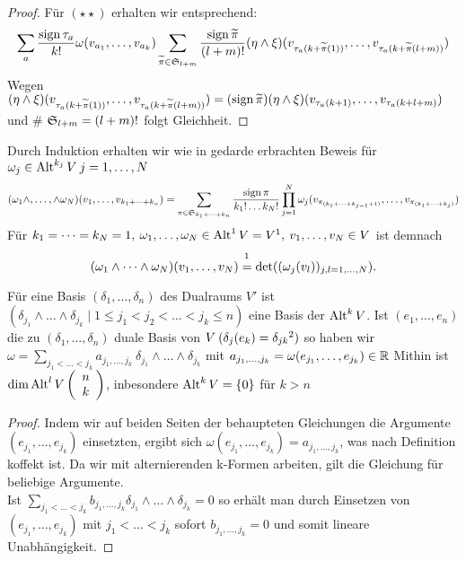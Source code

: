 \documentclass[skript.tex]{subfiles}
\begin{document}
\begin{proof}
		Für $(\star \star)$ erhalten wir entsprechend:
		\begin{equation*}
		\sum_a \frac{\operatorname{sign} \tau_a}{k!} \omega(v_{a_1}, \dots, v_{a_k})\sum_{\widetilde{\pi} \in \mathfrak{S}_{l+m}} \frac{\operatorname{sign} \widetilde{\pi}}{(l+m)!} (\eta \wedge \xi)(v_{\tau_a(k+\widetilde{\pi}(1))}, \dots, v_{\tau_a(k+\widetilde{\pi}(l+m))})
		\end{equation*}
		Wegen $(\eta \wedge \xi)(v_{\tau_a(k+\widetilde{\pi}(1))}, \dots, v_{\tau_a(k+\widetilde{\pi}(l+m))}) = (\operatorname{sign} \widetilde{\pi})(\eta \wedge \xi)(v_{\tau_a(k+1)}, \dots, v_{\tau_a(k+l+m)})$ und  \# $\mathfrak{S}_{l+m} = (l+m)!$ folgt Gleichheit.
	\end{proof}
		\begin{bem}
			Durch Induktion erhalten wir wie in gedarde erbrachten Beweis für $\omega_j \in \operatorname{Alt}^{k_j} V \: j=1, \dots, N$
			\begin{equation*}
			(\omega_1 \wedge, \dots, \wedge \omega_N)(v_1, \dots, v_{k_1+ \dots + k_n}) = \sum_{\pi \in \mathfrak{S}_{k_1 + \dots + k_n}} \frac{\operatorname{sign} \pi}{k_1! \dots k_N!} \prod_{j=1}^{N} \omega_j(v_{\pi_{(k_1+ \dots + k_{j-1}+1)}}, \dots, v_{\pi_{(k_1+ \dots + k_j)}})
			\end{equation*}
			Für $k_1 = \dots = k_N = 1, \: \omega_1, \dots, \omega_N \in \operatorname{Alt}^1 V = V^1, \: v_1, \dots, v_N \in V$ ist demnach 
			\[
				(\omega_1 \wedge \dots \wedge \omega_N)(v_1, \dots, v_N) \overset{\footnotemark}{=} \det((\omega_j(v_l))_{j,l = 1, \dots,N}).
			\] 
		\end{bem}
		\begin{theorem}
			Für eine Basis $(\delta_1, \dots, \delta_n)$ des Dualraums $V'$ ist $(\delta_{j_1} \wedge \dots \wedge \delta_{j_k} \mid 1 \leq j_1 < j_2 < \dots < j_k \leq n)$ eine Basis der $\operatorname{Alt}^k V$. Ist $(e_1, \dots, e_n)$ die zu $( \delta_1, \dots, \delta_n)$ duale Basis von $V \:(\delta_j(e_k) = \delta_{jk} \footnotemark)$  so haben wir $\omega = \sum_{j_1 < \dots < j_k} a_{j_1, \dots, j_k} \: \delta_{j_1} \wedge \dots \wedge \delta_{j_k}$ mit $a_{j_1, \dots, j_k} = \omega(e_{j_1}, \dots, e_{j_k}) \in \mathbb{R}$ Mithin ist $\dim \operatorname{Alt}^l V \left( \begin{array}{c}n\\k\end{array} \right)$, inbesondere $\operatorname{Alt}^k V = \{0\}$ für $k > n$
		\end{theorem}
		\begin{proof}
			Indem wir auf beiden Seiten der behaupteten Gleichungen die Argumente $(e_{j_1}, \dots, e_{j_k})$ einsetzten, ergibt sich $\omega (e_{j_1}, \dots, e_{j_k}) = a_{j_1, \dots, j_k}$, was nach Definition koffekt ist. Da wir mit alternierenden k-Formen arbeiten, gilt die Gleichung für beliebige Argumente.\\ Ist $\sum_{j_1 < \dots < j_k} b_{j_1, \dots, j_k} \delta_{j_1} \wedge \dots \wedge \delta_{j_k} = 0$ so erhält man durch Einsetzen von $(e_{j_1}, \dots, e_{j_k})$ mit $j_1 < \dots < j_k$ sofort $b_{j_1, \dots, j_k} = 0$ und somit lineare Unabhängigkeit.
		\end{proof}
	
\end{document}
